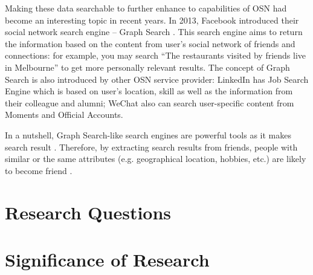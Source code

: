 Making these data searchable to further enhance to capabilities of OSN had become an interesting topic in recent years. In 2013, Facebook introduced their social network search engine -- Graph Search \cite{facebook2013graph}. This search engine aims to return the information based on the content from user's social network of friends and connections: for example, you may search ``The restaurants visited by friends live in Melbourne'' to get more personally relevant results. The concept of Graph Search is also introduced by other OSN service provider: LinkedIn has Job Search Engine which is based on user's location, skill as well as the information from their colleague and alumni; WeChat also can search user-specific content from Moments and Official Accounts. 

In a nutshell, Graph Search-like search engines are powerful tools as it makes search result . Therefore, by extracting search results from friends, people with similar or the same attributes (e.g. geographical location, hobbies, etc.) are likely to become friend \cite{mcpherson2001birds}. 
\section{Research Questions}

\section{Significance of Research}